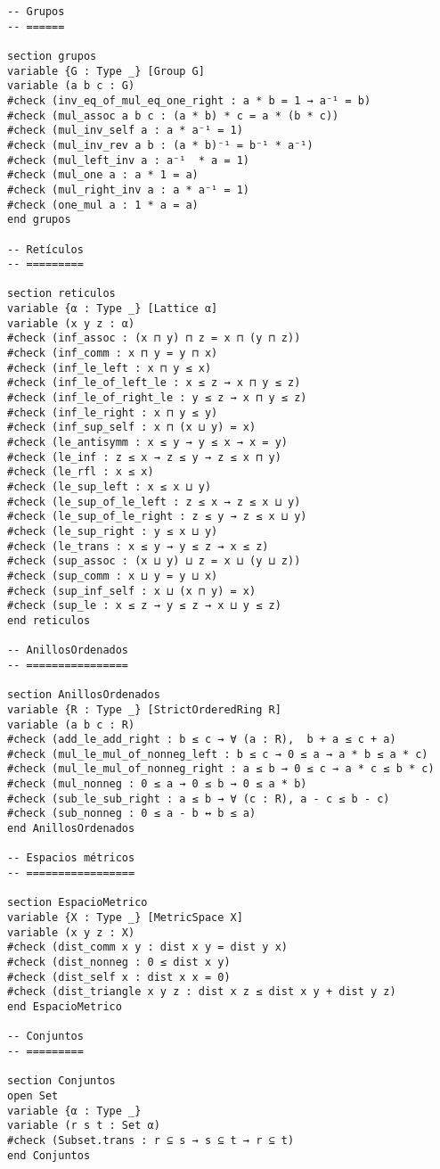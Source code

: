 \begin{verbatim}
-- Grupos
-- ======

section grupos
variable {G : Type _} [Group G]
variable (a b c : G)
#check (inv_eq_of_mul_eq_one_right : a * b = 1 → a⁻¹ = b)
#check (mul_assoc a b c : (a * b) * c = a * (b * c))
#check (mul_inv_self a : a * a⁻¹ = 1)
#check (mul_inv_rev a b : (a * b)⁻¹ = b⁻¹ * a⁻¹)
#check (mul_left_inv a : a⁻¹  * a = 1)
#check (mul_one a : a * 1 = a)
#check (mul_right_inv a : a * a⁻¹ = 1)
#check (one_mul a : 1 * a = a)
end grupos

-- Retículos
-- =========

section reticulos
variable {α : Type _} [Lattice α]
variable (x y z : α)
#check (inf_assoc : (x ⊓ y) ⊓ z = x ⊓ (y ⊓ z))
#check (inf_comm : x ⊓ y = y ⊓ x)
#check (inf_le_left : x ⊓ y ≤ x)
#check (inf_le_of_left_le : x ≤ z → x ⊓ y ≤ z)
#check (inf_le_of_right_le : y ≤ z → x ⊓ y ≤ z)
#check (inf_le_right : x ⊓ y ≤ y)
#check (inf_sup_self : x ⊓ (x ⊔ y) = x)
#check (le_antisymm : x ≤ y → y ≤ x → x = y)
#check (le_inf : z ≤ x → z ≤ y → z ≤ x ⊓ y)
#check (le_rfl : x ≤ x)
#check (le_sup_left : x ≤ x ⊔ y)
#check (le_sup_of_le_left : z ≤ x → z ≤ x ⊔ y)
#check (le_sup_of_le_right : z ≤ y → z ≤ x ⊔ y)
#check (le_sup_right : y ≤ x ⊔ y)
#check (le_trans : x ≤ y → y ≤ z → x ≤ z)
#check (sup_assoc : (x ⊔ y) ⊔ z = x ⊔ (y ⊔ z))
#check (sup_comm : x ⊔ y = y ⊔ x)
#check (sup_inf_self : x ⊔ (x ⊓ y) = x)
#check (sup_le : x ≤ z → y ≤ z → x ⊔ y ≤ z)
end reticulos

-- AnillosOrdenados
-- ================

section AnillosOrdenados
variable {R : Type _} [StrictOrderedRing R]
variable (a b c : R)
#check (add_le_add_right : b ≤ c → ∀ (a : R),  b + a ≤ c + a)
#check (mul_le_mul_of_nonneg_left : b ≤ c → 0 ≤ a → a * b ≤ a * c)
#check (mul_le_mul_of_nonneg_right : a ≤ b → 0 ≤ c → a * c ≤ b * c)
#check (mul_nonneg : 0 ≤ a → 0 ≤ b → 0 ≤ a * b)
#check (sub_le_sub_right : a ≤ b → ∀ (c : R), a - c ≤ b - c)
#check (sub_nonneg : 0 ≤ a - b ↔ b ≤ a)
end AnillosOrdenados

-- Espacios métricos
-- =================

section EspacioMetrico
variable {X : Type _} [MetricSpace X]
variable (x y z : X)
#check (dist_comm x y : dist x y = dist y x)
#check (dist_nonneg : 0 ≤ dist x y)
#check (dist_self x : dist x x = 0)
#check (dist_triangle x y z : dist x z ≤ dist x y + dist y z)
end EspacioMetrico

-- Conjuntos
-- =========

section Conjuntos
open Set
variable {α : Type _}
variable (r s t : Set α)
#check (Subset.trans : r ⊆ s → s ⊆ t → r ⊆ t)
end Conjuntos


\end{verbatim}
